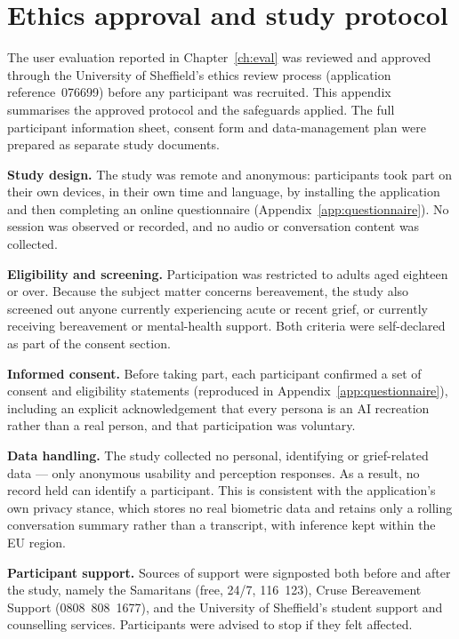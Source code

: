 \documentclass[11pt,a4paper]{report}
\begin{document}
\chapter{Ethics approval and study protocol}
\label{app:ethics}
The user evaluation reported in Chapter~\ref{ch:eval} was reviewed and approved through the University of Sheffield's ethics review process (application reference~076699) before any participant was recruited. This appendix summarises the approved protocol and the safeguards applied. The full participant information sheet, consent form and data-management plan were prepared as separate study documents.

\textbf{Study design.} The study was remote and anonymous: participants took part on their own devices, in their own time and language, by installing the application and then completing an online questionnaire (Appendix~\ref{app:questionnaire}). No session was observed or recorded, and no audio or conversation content was collected.

\textbf{Eligibility and screening.} Participation was restricted to adults aged eighteen or over. Because the subject matter concerns bereavement, the study also screened out anyone currently experiencing acute or recent grief, or currently receiving bereavement or mental-health support. Both criteria were self-declared as part of the consent section.

\textbf{Informed consent.} Before taking part, each participant confirmed a set of consent and eligibility statements (reproduced in Appendix~\ref{app:questionnaire}), including an explicit acknowledgement that every persona is an AI recreation rather than a real person, and that participation was voluntary.

\textbf{Data handling.} The study collected no personal, identifying or grief-related data --- only anonymous usability and perception responses. As a result, no record held can identify a participant. This is consistent with the application's own privacy stance, which stores no real biometric data and retains only a rolling conversation summary rather than a transcript, with inference kept within the EU region.

\textbf{Participant support.} Sources of support were signposted both before and after the study, namely the Samaritans (free, 24/7, 116~123), Cruse Bereavement Support (0808~808~1677), and the University of Sheffield's student support and counselling services. Participants were advised to stop if they felt affected.
\end{document}
